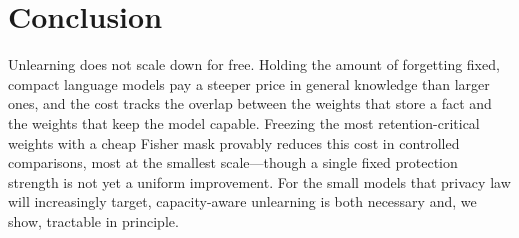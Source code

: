 \documentclass[sigconf,nonacm]{acmart}
\begin{document}
\section{Conclusion}
Unlearning does not scale down for free. Holding the amount of forgetting fixed, compact language models pay a steeper price in general knowledge than larger ones, and the cost tracks the overlap between the weights that store a fact and the weights that keep the model capable. Freezing the most retention-critical weights with a cheap Fisher mask provably reduces this cost in controlled comparisons, most at the smallest scale---though a single fixed protection strength is not yet a uniform improvement. For the small models that privacy law will increasingly target, capacity-aware unlearning is both necessary and, we show, tractable in principle.



\end{document}
